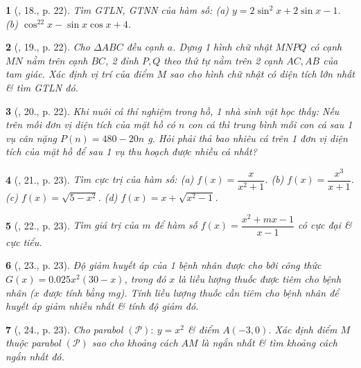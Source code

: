 \documentclass{article}
\newtheorem{baitoan}{}
\begin{document}
\begin{baitoan}[\cite{SGK_Toan_12_giai_tich_nang_cao}, 18., p. 22]
	Tìm {\rm GTLN, GTNN} của hàm số: (a) $y = 2\sin^2x + 2\sin x - 1$. (b) $\cos^22x - \sin x\cos x + 4$.
\end{baitoan}

\begin{baitoan}[\cite{SGK_Toan_12_giai_tich_nang_cao}, 19., p. 22]
	Cho $\Delta ABC$ đều cạnh $a$. Dựng 1 hình chữ nhật $MNPQ$ có cạnh $MN$ nằm trên cạnh $BC$, 2 đỉnh $P,Q$ theo thứ tự nằm trên 2 cạnh $AC,AB$ của tam giác. Xác định vị trí của điểm $M$ sao cho hình chữ nhật có diện tích lớn nhất \& tìm {\rm GTLN} đó.
\end{baitoan}

\begin{baitoan}[\cite{SGK_Toan_12_giai_tich_nang_cao}, 20., p. 22]
	Khi nuôi cá thí nghiệm trong hồ, 1 nhà sinh vật học thấy: Nếu trên mỗi đơn vị diện tích của mặt hồ có $n$ con cá thì trung bình mỗi con cá sau 1 vụ cân nặng $P(n) = 480 - 20n$ {\rm g}. Hỏi phải thả bao nhiêu cá trên 1 đơn vị diện tích của mặt hồ để sau 1 vụ thu hoạch được nhiều cá nhất?
\end{baitoan}

\begin{baitoan}[\cite{SGK_Toan_12_giai_tich_nang_cao}, 21., p. 23]
	Tìm cực trị của hàm số: (a) $f(x)  = \dfrac{x}{x^2 + 1}$. (b) $f(x) = \dfrac{x^3}{x + 1}$. (c) $f(x) = \sqrt{5 - x^2}$. (d) $f(x) = x + \sqrt{x^2 - 1}$.
\end{baitoan}

\begin{baitoan}[\cite{SGK_Toan_12_giai_tich_nang_cao}, 22., p. 23]
	Tìm giá trị của $m$ để hàm số $f(x) = \dfrac{x^2 + mx - 1}{x - 1}$ có cực đại \& cực tiểu.
\end{baitoan}

\begin{baitoan}[\cite{SGK_Toan_12_giai_tich_nang_cao}, 23., p. 23]
	Độ giảm huyết áp của 1 bệnh nhân được cho bởi công thức $G(x) = 0.025x^2(30 - x)$, trong đó $x$ là liều lượng thuốc được tiêm cho bệnh nhân ($x$ được tính bằng {\rm mg}). Tính liều lượng thuốc cần tiêm cho bệnh nhân để huyết áp giảm nhiều nhất \& tính độ giảm đó.
\end{baitoan}

\begin{baitoan}[\cite{SGK_Toan_12_giai_tich_nang_cao}, 24., p. 23]
	Cho parabol $(\mathcal{P}):\ y = x^2$ \& điểm $A(-3,0)$. Xác định điểm $M$ thuộc parabol $(\mathcal{P})$ sao cho khoảng cách $AM$ là ngắn nhất \& tìm khoảng cách ngắn nhất đó.
\end{baitoan}
\end{document}
